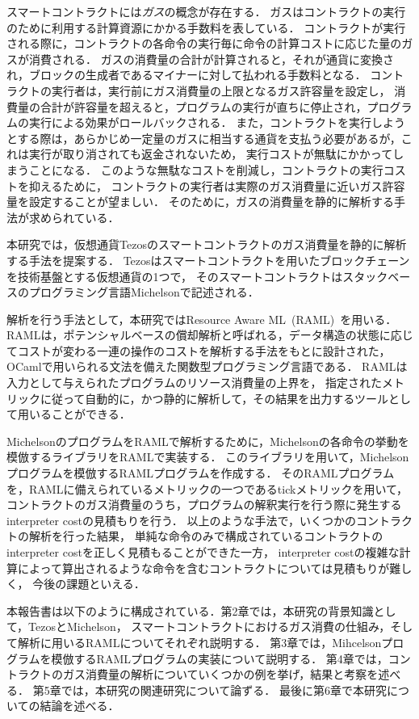 \documentclass{kuisthesis}
\begin{document}
スマートコントラクトには\emph{ガス}の概念が存在する\cite{tezos}．
ガスはコントラクトの実行のために利用する計算資源にかかる手数料を表している．
コントラクトが実行される際に，コントラクトの各命令の実行毎に命令の計算コストに応じた量のガスが消費される．
ガスの消費量の合計が計算されると，それが通貨に変換され，ブロックの生成者であるマイナーに対して払われる手数料となる．
コントラクトの実行者は，実行前にガス消費量の上限となるガス許容量を設定し，
消費量の合計が許容量を超えると，プログラムの実行が直ちに停止され，プログラムの実行による効果がロールバックされる．
また，コントラクトを実行しようとする際は，あらかじめ一定量のガスに相当する通貨を支払う必要があるが，これは実行が取り消されても返金されないため，
実行コストが無駄にかかってしまうことになる．
このような無駄なコストを削減し，コントラクトの実行コストを抑えるために，
コントラクトの実行者は実際のガス消費量に近いガス許容量を設定することが望ましい．
そのために，ガスの消費量を静的に解析する手法が求められている．

本研究では，仮想通貨Tezosのスマートコントラクトのガス消費量を静的に解析する手法を提案する．
Tezosはスマートコントラクトを用いたブロックチェーンを技術基盤とする仮想通貨の1つで，
そのスマートコントラクトはスタックベースのプログラミング言語Michelsonで記述される．

解析を行う手法として，本研究ではResource Aware ML\ (RAML)\ \cite{raml}を用いる．
RAMLは，ポテンシャルベースの償却解析と呼ばれる，データ構造の状態に応じてコストが変わる一連の操作のコストを解析する手法をもとに設計された\cite{amortized}，
OCamlで用いられる文法を備えた関数型プログラミング言語である．
RAMLは入力として与えられたプログラムのリソース消費量の上界を，
指定されたメトリックに従って自動的に，かつ静的に解析して，その結果を出力するツールとして用いることができる．

MichelsonのプログラムをRAMLで解析するために，Michelsonの各命令の挙動を模倣するライブラリをRAMLで実装する．
このライブラリを用いて，Michelsonプログラムを模倣するRAMLプログラムを作成する．
そのRAMLプログラムを，RAMLに備えられているメトリックの一つであるtickメトリックを用いて，
コントラクトのガス消費量のうち，プログラムの解釈実行を行う際に発生するinterpreter costの見積もりを行う．
以上のような手法で，いくつかのコントラクトの解析を行った結果，
単純な命令のみで構成されているコントラクトのinterpreter costを正しく見積もることができた一方，
interpreter costの複雑な計算によって算出されるような命令を含むコントラクトについては見積もりが難しく，
今後の課題といえる．

本報告書は以下のように構成されている．第2章では，本研究の背景知識として，TezosとMichelson，
スマートコントラクトにおけるガス消費の仕組み，そして解析に用いるRAMLについてそれぞれ説明する．
第3章では，Mihcelsonプログラムを模倣するRAMLプログラムの実装について説明する．
第4章では，コントラクトのガス消費量の解析についていくつかの例を挙げ，結果と考察を述べる．
第5章では，本研究の関連研究について論ずる．
最後に第6章で本研究についての結論を述べる．
\end{document}
